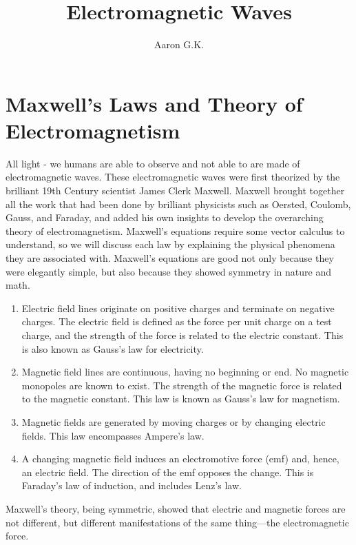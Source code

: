 \documentclass[11pt]{article}
\title{Electromagnetic Waves}
\author{Aaron G.K.}
\begin{document}
\maketitle
\section*{Maxwell's Laws and Theory of Electromagnetism}
All light - we humans are able to observe and not able to are made of electromagnetic waves. These electromagnetic waves were first theorized by the brilliant 19th Century scientist James Clerk Maxwell. Maxwell brought together all the work that had been done by brilliant physicists such as Oersted, Coulomb, Gauss, and Faraday, and added his own insights to develop the overarching theory of electromagnetism. Maxwell’s equations require some vector calculus to understand, so we will discuss each law by explaining the physical phenomena they are associated with. Maxwell's equations are good not only because they were elegantly simple, but also because they showed symmetry in nature and math.
\begin{enumerate}
	\item Electric field lines originate on positive charges and terminate on negative charges. The electric field is defined as the force per unit charge on a test charge, and the strength of the force is related to the electric constant. This is also known as Gauss’s law for electricity.
	\item Magnetic field lines are continuous, having no beginning or end. No magnetic monopoles are known to exist. The strength of the magnetic force is related to the magnetic constant. This law is known as Gauss’s law for magnetism.
	\item Magnetic fields are generated by moving charges or by changing electric fields. This law encompasses Ampere’s law.
	\item A changing magnetic field induces an electromotive force (emf) and, hence, an electric field. The direction of the emf opposes the change. This is Faraday’s law of induction, and includes Lenz’s law.
\end{enumerate}
Maxwell’s theory, being symmetric, showed that electric and magnetic forces are not different, but different manifestations of the same thing—the electromagnetic force.\\ \\
\end{document}
